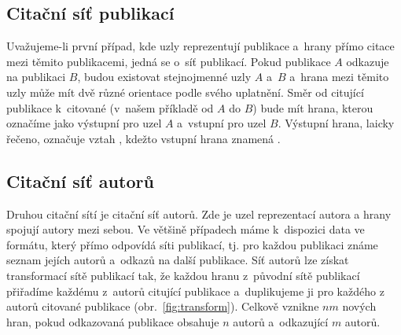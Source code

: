 \documentclass{bakalarka}
\begin{document}
\subsection{Citační síť publikací}
Uvažujeme-li první případ, kde uzly reprezentují publikace a~hrany přímo citace
mezi těmito publikacemi, jedná se o~síť publikací. Pokud publikace $A$ odkazuje
na publikaci $B$, budou existovat stejnojmenné uzly $A$ a~$B$ a~hrana mezi
těmito uzly může mít dvě různé orientace podle svého uplatnění. Směr od
citující publikace k~citované (v~našem příkladě od $A$ do $B$) bude mít hrana,
kterou označíme jako výstupní pro uzel $A$ a~vstupní pro uzel $B$.  Výstupní
hrana, laicky řečeno, označuje vztah , kdežto vstupní hrana znamená
.

\subsection{Citační síť autorů}
Druhou citační sítí je citační síť autorů. Zde je uzel reprezentací autora a
hrany spojují autory mezi sebou. Ve většině případech máme k~dispozici data ve
formátu, který přímo odpovídá síti publikací, tj. pro každou publikaci známe
seznam jejích autorů a~odkazů na další publikace. Síť autorů lze získat
transformací sítě publikací tak, že každou hranu z~původní sítě publikací
přiřadíme každému z~autorů citující publikace a~duplikujeme ji pro každého z
autorů citované publikace (obr.~\ref{fig:transform}). Celkově vznikne $nm$
nových hran, pokud odkazovaná publikace obsahuje $n$ autorů a~odkazující $m$
autorů. 
\end{document}
